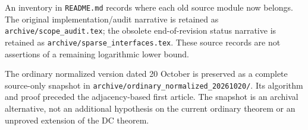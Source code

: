 An inventory in \texttt{README.md} records where each old source module
now belongs. The original implementation/audit narrative is retained as
\texttt{archive/scope\_audit.tex}; the obsolete end-of-revision status
narrative is retained as \texttt{archive/sparse\_interfaces.tex}. These
source records are not assertions of a remaining logarithmic lower bound.

The ordinary normalized version dated 20 October is preserved as a
complete source-only snapshot in
\texttt{archive/ordinary\_normalized\_20261020/}. Its algorithm and
proof preceded the adjacency-based first article. The snapshot is an
archival alternative, not an additional hypothesis on the current
ordinary theorem or an unproved extension of the DC theorem.

